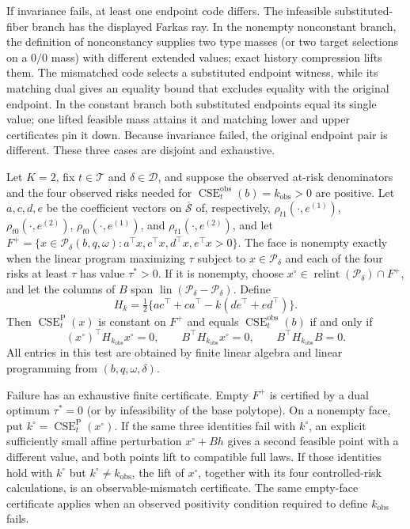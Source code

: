If invariance fails, at least one endpoint code differs.  The infeasible substituted-fiber branch has the displayed Farkas ray.  In the nonempty nonconstant branch, the definition of nonconstancy supplies two type masses (or two target selections on a \(0/0\) mass) with different extended values; exact history compression lifts them.  The mismatched code selects a substituted endpoint witness, while its matching dual gives an equality bound that excludes equality with the original endpoint.  In the constant branch both substituted endpoints equal its single value; one lifted feasible mass attains it and matching lower and upper certificates pin it down.  Because invariance failed, the original endpoint pair is different.  These three cases are disjoint and exhaustive.

Let \(K=2\), fix \(t\in\mathcal T\) and \(\delta\in\mathcal D\), and suppose the observed at-risk denominators and the four observed risks needed for \(\operatorname{CSE}^{\mathrm{obs}}_t(b)=k_{\mathrm{obs}}>0\) are positive.  Let \(a,c,d,e\) be the coefficient vectors on \(\overline{\mathcal S}\) of, respectively, \(\rho_{t1}(\cdot,e^{(1)})\), \(\rho_{t0}(\cdot,e^{(2)})\), \(\rho_{t0}(\cdot,e^{(1)})\), and \(\rho_{t1}(\cdot,e^{(2)})\), and let \(F^+=\{x\in\mathcal P_\delta(b,q,\omega):a^\top x,c^\top x,d^\top x,e^\top x>0\}\).  The face is nonempty exactly when the linear program maximizing \(\tau\) subject to \(x\in\mathcal P_\delta\) and each of the four risks at least \(\tau\) has value \(\tau^*>0\).  If it is nonempty, choose \(x^\circ\in\operatorname{relint}(\mathcal P_\delta)\cap F^+\), and let the columns of \(B\) span \(\operatorname{lin}(\mathcal P_\delta-\mathcal P_\delta)\).  Define
\[
H_k=\tfrac12\{ac^\top+ca^\top-k(de^\top+ed^\top)\}.
\]
Then \(\operatorname{CSE}^{\mathrm P}_t(x)\) is constant on \(F^+\) and equals \(\operatorname{CSE}^{\mathrm{obs}}_t(b)\) if and only if
\[
(x^\circ)^\top H_{k_{\mathrm{obs}}}x^\circ=0,
\qquad B^\top H_{k_{\mathrm{obs}}}x^\circ=0,
\qquad B^\top H_{k_{\mathrm{obs}}}B=0.
\]
All entries in this test are obtained by finite linear algebra and linear programming from \((b,q,\omega,\delta)\).

Failure has an exhaustive finite certificate.  Empty \(F^+\) is certified by a dual optimum \(\tau^*=0\) (or by infeasibility of the base polytope).  On a nonempty face, put \(k^\circ=\operatorname{CSE}^{\mathrm P}_t(x^\circ)\).  If the same three identities fail with \(k^\circ\), an explicit sufficiently small affine perturbation \(x^\circ+Bh\) gives a second feasible point with a different value, and both points lift to compatible full laws.  If those identities hold with \(k^\circ\) but \(k^\circ\ne k_{\mathrm{obs}}\), the lift of \(x^\circ\), together with its four controlled-risk calculations, is an observable-mismatch certificate.  The same empty-face certificate applies when an observed positivity condition required to define \(k_{\mathrm{obs}}\) fails.

